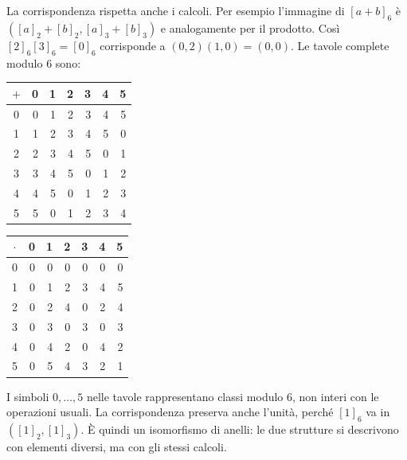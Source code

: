 La corrispondenza rispetta anche i calcoli. Per esempio l'immagine di $[a+b]_6$ è $([a]_2+[b]_2,[a]_3+[b]_3)$ e analogamente per il prodotto. Così $[2]_6[3]_6=[0]_6$ corrisponde a $(0,2)(1,0)=(0,0)$. Le tavole complete modulo $6$ sono:
\begin{schema}
\renewcommand{\arraystretch}{1.18}
\begin{tabular}{c|rrrrrr}
$+$&0&1&2&3&4&5\\\hline
0&0&1&2&3&4&5\\
1&1&2&3&4&5&0\\
2&2&3&4&5&0&1\\
3&3&4&5&0&1&2\\
4&4&5&0&1&2&3\\
5&5&0&1&2&3&4
\end{tabular}
\qquad
\begin{tabular}{c|rrrrrr}
$\cdot$&0&1&2&3&4&5\\\hline
0&0&0&0&0&0&0\\
1&0&1&2&3&4&5\\
2&0&2&4&0&2&4\\
3&0&3&0&3&0&3\\
4&0&4&2&0&4&2\\
5&0&5&4&3&2&1
\end{tabular}
\end{schema}
I simboli $0,\ldots,5$ nelle tavole rappresentano classi modulo $6$, non interi con le operazioni usuali.
La corrispondenza preserva anche l'unità, perché $[1]_6$ va in $([1]_2,[1]_3)$. È quindi un isomorfismo di anelli: le due strutture si descrivono con elementi diversi, ma con gli stessi calcoli.

